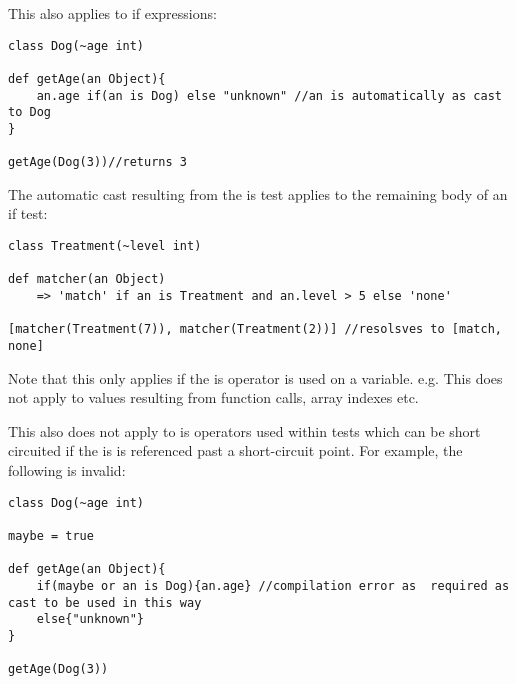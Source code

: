 \documentclass[conc-doc]{subfiles}
\begin{document}
This also applies to if expressions:
\begin{lstlisting}
class Dog(~age int)

def getAge(an Object){
	an.age if(an is Dog) else "unknown" //an is automatically as cast to Dog 
}

getAge(Dog(3))//returns 3
\end{lstlisting}

The automatic cast resulting from the is test applies to the remaining body of an if test:
\begin{lstlisting}
class Treatment(~level int)

def matcher(an Object) 
	=> 'match' if an is Treatment and an.level > 5 else 'none'

[matcher(Treatment(7)), matcher(Treatment(2))] //resolsves to [match, none]
\end{lstlisting}

Note that this only applies if the is operator is used on a variable. e.g. This does not apply to values resulting from function calls, array indexes etc.

This also does not apply to is operators used within tests which can be short circuited if the is is referenced past a short-circuit point. For example, the following is invalid:

\begin{lstlisting}
class Dog(~age int)

maybe = true

def getAge(an Object){
	if(maybe or an is Dog){an.age} //compilation error as  required as cast to be used in this way
	else{"unknown"}
}

getAge(Dog(3))
\end{lstlisting}
\end{document}
